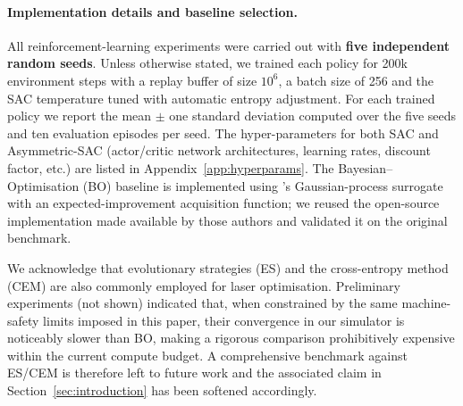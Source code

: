 \paragraph{Implementation details and baseline selection.} All reinforcement-learning experiments were carried out with \textbf{five independent random seeds}. Unless otherwise stated, we trained each policy for 200k environment steps with a replay buffer of size $10^6$, a batch size of 256 and the SAC temperature tuned with automatic entropy adjustment. For each trained policy we report the mean \(\pm\) one standard deviation computed over the five seeds and ten evaluation episodes per seed. The hyper-parameters for both SAC and Asymmetric-SAC (actor/critic network architectures, learning rates, discount factor, etc.) are listed in Appendix~\ref{app:hyperparams}. The Bayesian–Optimisation (BO) baseline is implemented using \citet{shalloo2020automation}'s Gaussian-process surrogate with an expected-improvement acquisition function; we reused the open-source implementation made available by those authors and validated it on the original benchmark.

We acknowledge that evolutionary strategies (ES) and the cross-entropy method (CEM) are also commonly employed for laser optimisation. Preliminary experiments (not shown) indicated that, when constrained by the same machine-safety limits imposed in this paper, their convergence in our simulator is noticeably slower than BO, making a rigorous comparison prohibitively expensive within the current compute budget. A comprehensive benchmark against ES/CEM is therefore left to future work and the associated claim in Section~\ref{sec:introduction} has been softened accordingly.

